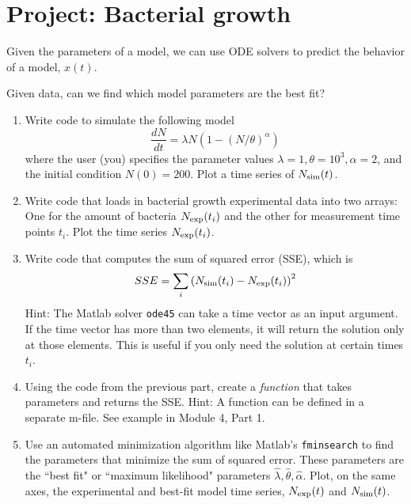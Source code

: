 \documentclass{exam}
\begin{document}
\section*{Project: Bacterial growth}
 
 
Given the parameters of a model, we can use ODE solvers to predict the behavior of a model, $x(t)$. 

Given data, can we find which model parameters are the best fit? 


\begin{enumerate}[a]
\item Write code to simulate the following model
\begin{equation}
\frac{dN}{dt} = \lambda N \left( 1 - \left(N/\theta\right)^\alpha\right) 
\end{equation}
where the user (you) specifies the parameter values $\lambda=1,\theta=10^3,\alpha=2$, and the initial condition $N(0)=200$. Plot a time series of $N_{\rm sim}(t)$.
\item Write code that loads in bacterial growth experimental data into two arrays: One for the amount of bacteria $N_{\rm exp}(t_i)$ and the other for measurement time points $t_i$. Plot the time series $N_{\rm exp}(t_i)$. 
\item Write code that computes the sum of squared error (SSE), which is 
\begin{equation}
SSE = \sum_i \left( N_{\rm sim}(t_i) - N_{\rm exp}(t_i)\right)^2
\end{equation}
Hint: The Matlab solver \verb|ode45| can take a time vector as an input argument. If the time vector has more than two elements, it will return the solution only at those elements. This is useful if you only need the solution at certain times $t_i$. 
\item Using the code from the previous part, create a \textit{function} that takes parameters and returns the SSE.
Hint: A function can be defined in a separate m-file. See example in Module 4, Part 1.  
\item Use an automated minimization algorithm like Matlab's \verb|fminsearch| to find the parameters that minimize the sum of squared error. 
These parameters are the ``best fit" or ``maximum likelihood" parameters $\hat\lambda,\hat\theta,\hat\alpha$.  
Plot, on the same axes, the experimental and best-fit model time series, $N_{\rm exp}(t)$ and $N_{\rm sim}(t)$.
\end{enumerate}
 

  
\end{document}
